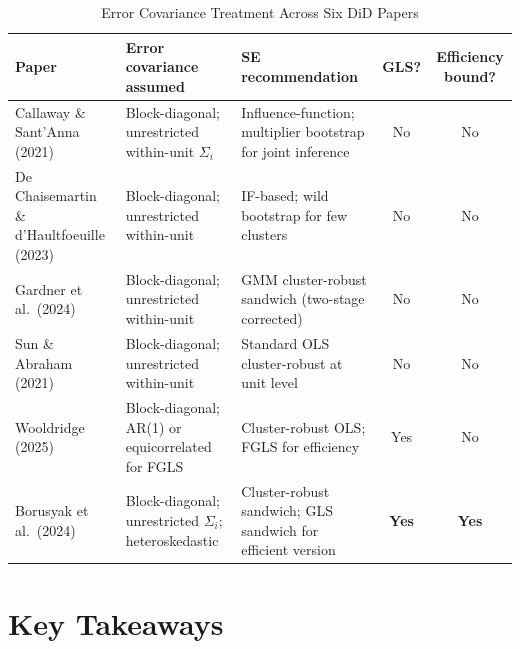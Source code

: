 \documentclass[12pt]{article}
\begin{document}
\begin{table}[ht]
\centering
\caption{Error Covariance Treatment Across Six DiD Papers}
\label{tab:summary}
\renewcommand{\arraystretch}{1.4}
\begin{tabularx}{\textwidth}{@{}lXXcc@{}}
\toprule
\textbf{Paper} & \textbf{Error covariance assumed} & \textbf{SE recommendation}
  & \textbf{GLS?} & \textbf{Efficiency bound?} \\
\midrule
Callaway \& Sant'Anna (2021)
  & Block-diagonal; unrestricted within-unit $\Sigma_i$
  & Influence-function; multiplier bootstrap for joint inference
  & No & No \\
De Chaisemartin \& d'Haultfoeuille (2023)
  & Block-diagonal; unrestricted within-unit
  & IF-based; wild bootstrap for few clusters
  & No & No \\
Gardner et al.\ (2024)
  & Block-diagonal; unrestricted within-unit
  & GMM cluster-robust sandwich (two-stage corrected)
  & No & No \\
Sun \& Abraham (2021)
  & Block-diagonal; unrestricted within-unit
  & Standard OLS cluster-robust at unit level
  & No & No \\
Wooldridge (2025)
  & Block-diagonal; AR(1) or equicorrelated for FGLS
  & Cluster-robust OLS; FGLS for efficiency
  & Yes & No \\
Borusyak et al.\ (2024)
  & Block-diagonal; unrestricted $\Sigma_i$; heteroskedastic
  & Cluster-robust sandwich; GLS sandwich for efficient version
  & \textbf{Yes} & \textbf{Yes} \\
\bottomrule
\end{tabularx}
\end{table}

\section{Key Takeaways}
\end{document}
